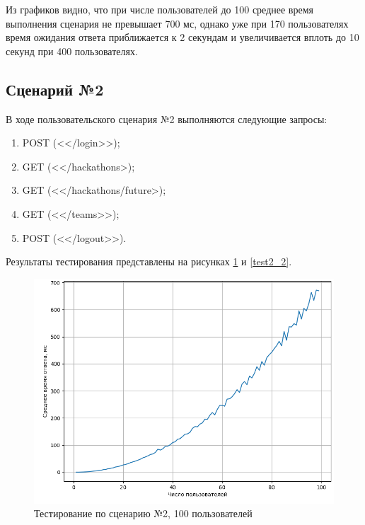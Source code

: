 Из графиков видно, что при числе пользователей до 100 среднее время выполнения сценария не превышает 700 мс, однако уже при 170 пользователях время ожидания ответа приближается к 2 секундам и увеличивается вплоть до 10 секунд при 400 пользователях.

\subsection{Сценарий №2}

В ходе пользовательского сценария №2 выполняются следующие запросы:

\begin{enumerate}[label={\arabic*)}]
    \item POST (<</login>>);
    \item GET (<</hackathons>);
    \item GET (<</hackathons/future>);
    \item GET (<</teams>>);
    \item POST (<</logout>>).
\end{enumerate}

Результаты тестирования представлены на рисунках \ref{test2_1} и \ref{test2_2}.


\begin{figure}[H]
	\begin{center}
		\includegraphics[page=1,scale=0.8]{assets/exp2_100.png}
	\end{center}
	\caption{Тестирование по сценарию №2, 100 пользователей}
	\label{test2_1}
\end{figure}

